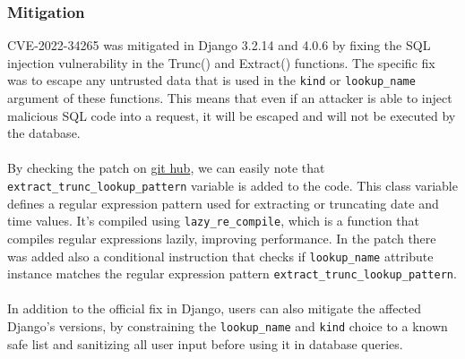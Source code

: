 \documentclass{article}
\begin{document}
	\subsubsection{Mitigation}
	 CVE-2022-34265 was mitigated in Django 3.2.14 and 4.0.6 by fixing the SQL injection vulnerability in the Trunc() and Extract() functions. The specific fix was to escape any untrusted data that is used in the \verb|kind| or \verb|lookup_name| argument of these functions. This means that even if an attacker is able to inject malicious SQL code into a request, it will be escaped and will not be executed by the database. \\ \\
	  By checking the patch on \href{https://github.com/django/django/commit/0dc9c016fadb71a067e5a42be30164e3f96c0492}{git hub}, we can easily note that \verb|extract_trunc_lookup_pattern| variable is added to the code. This class variable defines a regular expression pattern used for extracting or truncating date and time values. It's compiled using \verb|lazy_re_compile|, which is a function that compiles regular expressions lazily, improving performance. In the patch there was added also a conditional instruction that checks if \verb|lookup_name| attribute instance matches the regular expression pattern \verb|extract_trunc_lookup_pattern|. \\  \\
	  In addition to the official fix in Django, users can also mitigate the affected Django's versions, by constraining the \verb|lookup_name| and \verb|kind| choice to a known safe list and sanitizing all user input before using it in database queries.
	  \newpage
\end{document}
